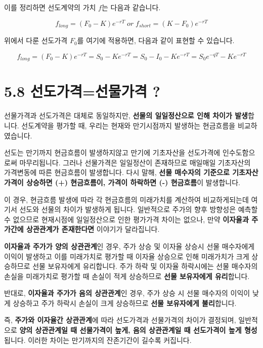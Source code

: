 \documentclass[
  letterpaper,
  DIV=11,
  numbers=noendperiod]{scrreprt}
\begin{document}
이를 정리하면 선도계약의 가치 \(f\)는 다음과 같습니다.

\[f_{long}=(F_0-K)e^{-rT}\;or\;f_{short}=(K-F_0)e^{-rT}\]

위에서 다룬 선도가격 \(F_0\)를 여기에 적용하면, 다음과 같이 표현할 수
있습니다.

\[f_{long}=(F_0-K)e^{-rT}=S_0-Ke^{-rT}=S_0-I_0-Ke^{-rT}=S_0e^{-qT}-Ke^{-rT}\]

\section*{5.8 선도가격=선물가격
?}\label{uxc120uxb3c4uxac00uxaca9uxc120uxbb3cuxac00uxaca9}


선물가격과 선도가격은 대체로 동일하지만, \textbf{선물의 일일정산으로
인해 차이가 발생}합니다. 선도계약을 평가할 때, 우리는 현재와
만기시점까지 발생하는 현금흐름을 비교하였습니다.

선도는 만기까지 현금흐름이 발생하지않고 만기에 기초자산을 선도가격에
인수도함으로써 마무리됩니다. 그러나 선물가격은 일일정산이 존재하므로
매일매일 기초자산의 가격변동에 따른 현금흐름이 발생합니다. 다시 말해,
\textbf{선물 매수자의 기준으로 기초자산 가격이 상승하면 (+) 현금흐름이,
가격이 하락하면 (-) 현금흐름}이 발생합니다.

이 경우, 현금흐름 발생에 따라 각 현금흐름의 미래가치를 계산하여
비교하게되는데 여기서 선도와 선물의 차이가 발생하게 됩니다. 일반적으로
주가의 향후 방향성은 예측할 수 없으므로 현재시점에 일일정산으로 인한
평가가격 차이는 없으나, 만약 \textbf{이자율과 주가간에 상관관계가
존재한다면} 이야기가 달라집니다.

\textbf{이자율과 주가가 양의 상관관계}인 경우, 주가 상승 및 이자율
상승시 선물 매수자에게 이익이 발생하고 이를 미래가치로 평가할 때 이자율
상승으로 인해 미래가치가 크게 상승하므로 선물 보유자에게 유리합니다.
주가 하락 및 이자율 하락시에는 선물 매수자의 손실을 미래가치로 평가할 때
손실이 적게 상승하므로 \textbf{선물 보유자에게 유리}합니다.

반대로, \textbf{이자율과 주가가 음의 상관관계}인 경우, 주가 상승 시 선물
매수자의 이익이 낮게 상승하고 주가 하락시 손실이 크게 상승하므로
\textbf{선물 보유자에게 불리}합니다.

즉, \textbf{주가와 이자율간 상관관계}에 따라 선도가격과 선물가격의
차이가 결정되며, 일반적으로 \textbf{양의 상관관계일 때 선물가격이 높게,
음의 상관관계일 때 선도가격이 높게 형성}됩니다. 이러한 차이는 만기까지의
잔존기간이 길수록 커집니다.
\end{document}
